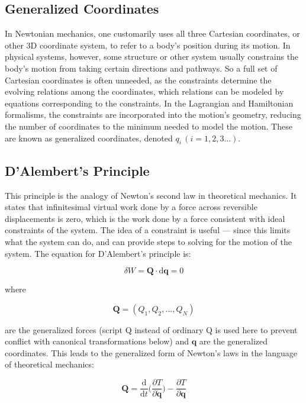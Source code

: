 \documentclass[
  notoc %
]{tufte-book}
\begin{document}
\hypertarget{generalized-coordinates}{%
\subsection{Generalized Coordinates}\label{generalized-coordinates}}

In Newtonian mechanics, one customarily uses all three Cartesian
coordinates, or other 3D coordinate system, to refer to a body's
position during its motion. In physical systems, however, some structure
or other system usually constrains the body's motion from taking certain
directions and pathways. So a full set of Cartesian coordinates is often
unneeded, as the constraints determine the evolving relations among the
coordinates, which relations can be modeled by equations corresponding
to the constraints. In the Lagrangian and Hamiltonian formalisms, the
constraints are incorporated into the motion's geometry, reducing the
number of coordinates to the minimum needed to model the motion. These
are known as generalized coordinates, denoted
\(q_i\, (i = 1, 2, 3...)\).

\hypertarget{dalemberts-principle}{%
\subsection{D'Alembert's Principle}\label{dalemberts-principle}}

This principle is the analogy of Newton's second law in theoretical
mechanics. It states that infinitesimal virtual work done by a force
across reversible displacements is zero, which is the work done by a
force consistent with ideal constraints of the system. The idea of a
constraint is useful --- since this limits what the system can do, and
can provide steps to solving for the motion of the system. The equation
for D'Alembert's principle is:

\[
\delta W = \mathbf{Q}\cdot \mathrm{d}\mathbf{q} = 0
\]

where

\[
\mathbf{Q} = (Q_1, Q_2, ..., Q_N)
\]

are the generalized forces (script Q instead of ordinary Q is used here
to prevent conflict with canonical transformations below) and
\(\mathbf{q}\) are the generalized coordinates. This leads to the
generalized form of Newton's laws in the language of theoretical
mechanics:

\[
\mathbf{Q} = \frac{\mathrm{d}}{\mathrm{d}t}\Big( \frac{\partial T}{\partial\dot{\mathbf{q}}} \Big) - \frac{\partial T}{\partial\mathbf{q}}
\]
\end{document}
